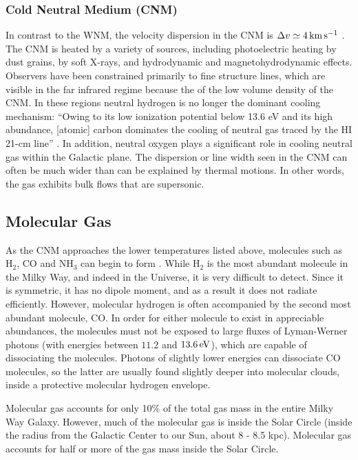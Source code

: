 \documentclass[../dissertation.tex]{subfiles}
\begin{document}
\subsubsection{Cold Neutral Medium (CNM)}
In contrast to the WNM, the velocity dispersion in the CNM is $\Delta v \simeq 4 \,\rm km\,s^{-1}$ \citep[p. 49]{2009ARA&A..47...27K}.
The CNM is heated by a variety of sources, including photoelectric heating by dust grains, by soft X-rays, and hydrodynamic and magnetohydrodynamic effects.
Observers have been constrained primarily to fine structure lines, which are visible in the far infrared regime because the of the low volume density of the CNM. 
In these regions neutral hydrogen is no longer the dominant cooling mechanism: 
``Owing to its low ionization potential below 13.6 eV and its high abundance, [atomic] carbon dominates the cooling of neutral gas traced by the HI 21-cm line'' \citep[p. 48]{2009ARA&A..47...27K}. 
In addition, neutral oxygen plays a significant role in cooling neutral gas within the Galactic plane. 
The dispersion or line width seen in the CNM can often be much wider than can be explained by thermal motions. 
In other words, the gas exhibits bulk flows that are supersonic. 


\subsection{Molecular Gas} \label{subsec:intro_molecular_gas}
As the CNM approaches the lower temperatures listed above, molecules such as H$_2$, CO and NH$_3$ can begin to form \citep[p. 47]{2009ARA&A..47...27K}. 
While H$_2$ is the most abundant molecule in the Milky Way, and indeed in the Universe, it is very difficult to detect. 
Since it is symmetric, it has no dipole moment, and as a result it does not radiate efficiently. 
However, molecular hydrogen is often accompanied by the second most abundant molecule, CO. 
In order for either molecule to exist in appreciable abundances, the molecules must not be exposed to large fluxes of Lyman-Werner photons (with energies between $11.2$ and $13.6\,{\rm eV}$), which are capable of dissociating the molecules. Photons of slightly lower energies can dissociate CO molecules, so the latter are usually found slightly deeper into molecular clouds, inside a protective molecular hydrogen envelope.

Molecular gas accounts for only 10\% of the total gas mass in the entire Milky Way Galaxy.
However, much of the molecular gas is inside the Solar Circle (inside the radius from the Galactic Center to our Sun, about 8 - 8.5 kpc). 
Molecular gas accounts for half or more of the gas mass inside the Solar Circle. 
\end{document}
